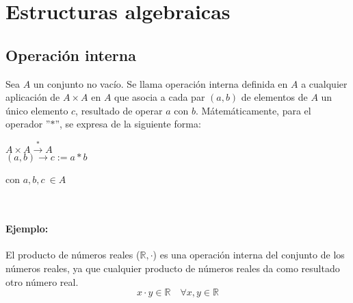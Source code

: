 




    
\setcounter{chapter}{1}

\chapter{Estructuras algebraicas}

\section{Operación interna}
Sea $A$ un conjunto no vacío. Se llama operación interna definida en $A$ a cualquier aplicación de $A \times A$ en $A$ que asocia a cada par $(a,b)$ de elementos de $A$ un único elemento $c$, resultado de operar $a$ con $b$. Mátemáticamente, para el operador ''$*$'', se expresa de la siguiente forma:\\

\begin{minipage}{0.5\textwidth}
\begin{center}
$A\times A \overset{*}{\rightarrow} A$\\
$(a,b) \rightarrow c:=a*b$
\end{center}
\end{minipage}
\begin{minipage}{0.5\textwidth}
con $a,b,c \ \in A$
\end{minipage}\\

\subsubsection*{Ejemplo: }
El producto de números reales ($\mathbb{R}, \cdot $) es una operación interna del conjunto de los números reales, ya que cualquier producto de números reales da como resultado otro número real.
$$
x \cdot y \in \mathbb{R} \quad \forall x,y \in \mathbb{R}
$$

